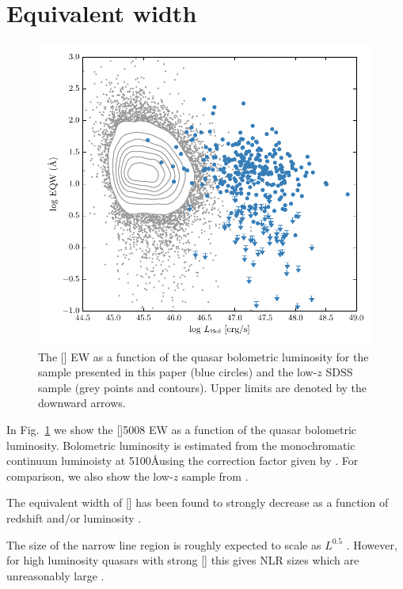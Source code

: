 \section{Equivalent width}

\begin{figure}
    \includegraphics[width=\columnwidth]{figures/chapter04/eqw_lum.pdf} 
    \caption{The [] EW as a function of the quasar bolometric luminosity for the sample presented in this paper (blue circles) and the low-$z$ SDSS sample (grey points and contours). Upper limits are denoted by the downward arrows.}     
    \label{fig:eqw_lum}
\end{figure}

In Fig.~\ref{fig:eqw_lum} we show the []5008 EW as a function of the quasar bolometric luminosity. 
Bolometric luminosity is estimated from the monochromatic continuum luminoisty at 5100\AA using the correction factor given by \citet{richards06}. 
For comparison, we also show the low-$z$ sample from \citet{shen11}.  

The equivalent width of [] has been found to strongly decrease as a function of redshift and/or luminosity \citep[e.g.][]{brotherton96,netzer04,sulentic04,baskin05b}. 

The size of the narrow line region is roughly expected to scale as $L^{0.5}$ \citep[e.g.][]{netzer04}. 
However, for high luminosity quasars with strong [] this gives NLR sizes which are unreasonably large \citep[$\sim$100 kpc;][]{netzer04}. 

